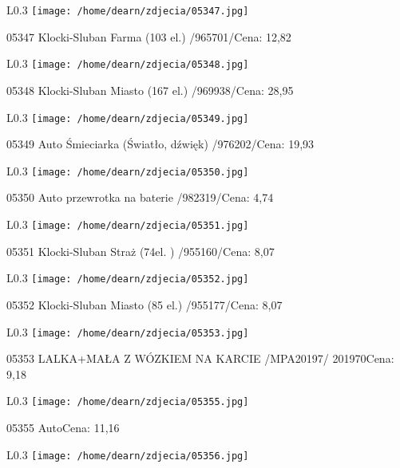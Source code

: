 \begin{wrapfigure}{L}{0.3\textwidth}
\texttt{[image: /home/dearn/zdjecia/05347.jpg]}
\end{wrapfigure}
05347 Klocki-Sluban Farma (103 el.)   /965701/Cena: 12,82\newline
\begin{wrapfigure}{L}{0.3\textwidth}
\texttt{[image: /home/dearn/zdjecia/05348.jpg]}
\end{wrapfigure}
05348 Klocki-Sluban Miasto (167 el.)  /969938/Cena: 28,95\newline
\begin{wrapfigure}{L}{0.3\textwidth}
\texttt{[image: /home/dearn/zdjecia/05349.jpg]}
\end{wrapfigure}
05349 Auto Śmieciarka (Światło, dźwięk)  /976202/Cena: 19,93\newline
\begin{wrapfigure}{L}{0.3\textwidth}
\texttt{[image: /home/dearn/zdjecia/05350.jpg]}
\end{wrapfigure}
05350 Auto przewrotka na baterie /982319/Cena: 4,74\newline
\begin{wrapfigure}{L}{0.3\textwidth}
\texttt{[image: /home/dearn/zdjecia/05351.jpg]}
\end{wrapfigure}
05351 Klocki-Sluban Straż (74el. )  /955160/Cena: 8,07\newline
\begin{wrapfigure}{L}{0.3\textwidth}
\texttt{[image: /home/dearn/zdjecia/05352.jpg]}
\end{wrapfigure}
05352 Klocki-Sluban Miasto (85 el.)  /955177/Cena: 8,07\newline
\begin{wrapfigure}{L}{0.3\textwidth}
\texttt{[image: /home/dearn/zdjecia/05353.jpg]}
\end{wrapfigure}
05353 LALKA+MAŁA Z WÓZKIEM NA KARCIE /MPA20197/       201970Cena: 9,18\newline
\begin{wrapfigure}{L}{0.3\textwidth}
\texttt{[image: /home/dearn/zdjecia/05355.jpg]}
\end{wrapfigure}
05355 AutoCena: 11,16\newline
\begin{wrapfigure}{L}{0.3\textwidth}
\texttt{[image: /home/dearn/zdjecia/05356.jpg]}
\end{wrapfigure}
